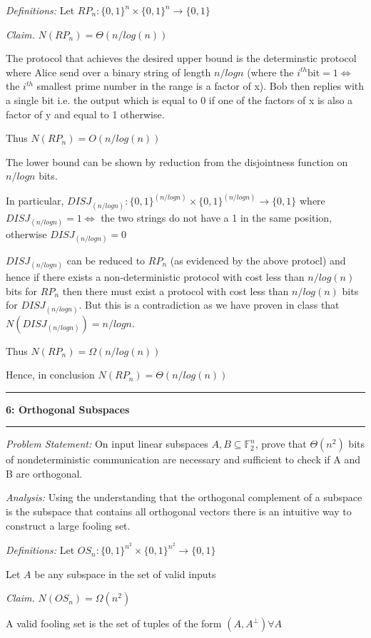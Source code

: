 \documentclass[11pt]{article}
\newcommand\question[2]{\vspace{.25in}\hrule\textbf{#1: #2}\vspace{.5em}\hrule\vspace{.10in}}
\newcommand\analysis{\vspace{.10in}\emph{Analysis: }\newline}
\newcommand\problem{\emph{Problem Statement:}\newline}
\newcommand\definitions{\emph{Definitions:}\newline}
\newcommand\claim{\emph{Claim.}\newline}
\begin{document}
\definitions
Let $RP_n: {\{0, 1\}}^n \times {\{0, 1\}}^n \to \{0, 1\}$

\claim
$N(RP_n) = \Theta(n/log(n))$ 

\proof 
The protocol that achieves the desired upper bound is the determinstic protocol where Alice send over a binary string of length $n/logn$ (where the $i^{th} \text{bit} = 1 \iff$ the $i^{th}$ smallest prime number in the range is a factor of x). Bob then replies with a single bit i.e. the output which is equal to 0 if one of the factors of x is also a factor of y and equal to 1 otherwise. 

Thus $N(RP_n) = O(n/log(n))$

The lower bound can be shown by reduction from the disjointness function on $n/logn$ bits. 

In particular, $DISJ_{(n/logn)}: {\{0, 1\}}^{(n/logn)} \times {\{0, 1\}}^{(n/logn)} \to \{0, 1\}$ where $DISJ_{(n/logn)} = 1 \iff$ the two strings do not have a 1 in the same position, otherwise $DISJ_{(n/logn)} = 0$

$DISJ_{(n/logn)}$ can be reduced to $RP_n$ (as evidenced by the above protocl) and hence if there exists a non-deterministic protocol with cost less than $n/log(n)$ bits for $RP_n$ then there must exist a protocol with cost less than $n/log(n)$ bits for $DISJ_{(n/logn)}$. But this is a contradiction as we have proven in class that $N(DISJ_{(n/logn)}) = n/logn$.

Thus $N(RP_n) = \Omega(n/log(n))$

Hence, in conclusion $N(RP_n) = \Theta(n/log(n))$

\newpage

\question{6}{Orthogonal Subspaces}

\problem
On input linear subspaces $A, B \subseteq \mathbb{F}_2^n$, prove that $\Theta(n^2)$ bits of nondeterministic communication are necessary and sufficient to check if A and B are orthogonal.

\analysis
Using the understanding that the orthogonal complement of a subspace is the subspace that contains all orthogonal vectors there is an intuitive way to construct a large fooling set. 

\definitions
Let $OS_n: {\{0, 1\}}^{n^2} \times {\{0, 1\}}^{n^2} \to \{0, 1\}$

Let $A$ be any subspace in the set of valid inputs

\claim
$N(OS_n) = \Omega(n^2)$ 

\proof 
A valid fooling set is the set of tuples of the form $(A, A^{\perp}) \forall A$
\end{document}
